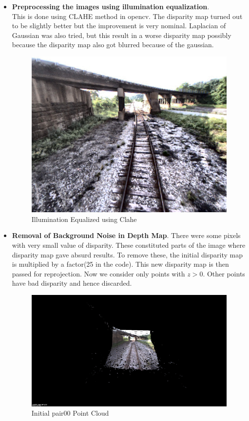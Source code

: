\documentclass{article}
\begin{document}
\begin{itemize}
\item \textbf{Preprocessing the images using illumination equalization}.\\ This is done using CLAHE method in opencv. The disparity map turned out to be slightly better but the improvement is very nominal. Laplacian of Gaussian was also tried, but this result in a worse disparity map possibly because the disparity map also got blurred because of the gaussian.
  \begin{figure}[H]
    \centering
    \includegraphics[scale=0.25]{images/clahe}
    \caption{Illumination Equalized using Clahe}
  \end{figure}
\item \textbf{Removal of Background Noise in Depth Map}. There were some pixels with very small value of disparity. These constituted parts of the image where disparity map gave absurd results. To remove these, the initial disparity map is multiplied by a factor(25 in the code). This new disparity map is then passed for reprojection. Now we consider only points with $z>0$. Other points have bad disparity and hence discarded.
    \begin{figure}[H]
    \centering
    \includegraphics[scale=0.25]{images/pair00_with_all_noise}
    \caption{Initial pair00 Point Cloud}
  \end{figure}
  

\end{itemize}
\end{document}
